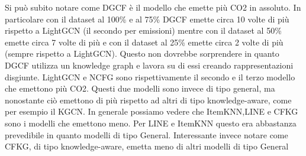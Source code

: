 \noindent Si può subito notare come DGCF è il modello che emette più CO2 in assoluto.
In particolare con il dataset al 100\% e al 75\% DGCF emette circa 10 volte di più rispetto a LightGCN (il secondo per emissioni)
mentre con il dataset al 50\% emette circa 7 volte di più e con il dataset al 25\% emette circa 2 volte di più (sempre rispetto a LightGCN).
Questo non dovrebbe sorprendere in quanto DGCF utilizza un knowledge graph e lavora su di essi creando rappresentazioni disgiunte.
LightGCN e NCFG sono rispettivamente il secondo e il terzo modello che emettono più CO2.
Questi due modelli sono invece di tipo general, ma nonostante ciò emettono di più rispetto ad altri di tipo knowledge-aware, come per esempio il KGCN.
In generale possiamo vedere che ItemKNN,LINE e CFKG sono i modelli che emettono meno.
Per LINE e ItemKNN questo era abbastanza prevedibile in quanto modelli di tipo General. Interessante invece notare come CFKG, di tipo knowledge-aware, emetta meno di altri modelli di tipo General





